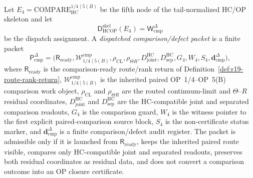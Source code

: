 \begin{definition}
\label{def:dispatched-comparison-defect-packet}
Let \(E_4=\mathrm{COMPARE}_{\mathrm{HC}}^{1/4\mid 5(B)}\) be the fifth node of the tail-normalized HC/OP skeleton and let
\[
 \mathsf D_{\mathrm{HCOP}}^{\mathrm{skel}}(E_4)
 =
 \mathsf W_{\mathrm{cmp}}^{\Delta}
\]
be the dispatch assignment. A \emph{dispatched comparison/defect packet} is a finite packet
\[
 \mathsf P_{\mathrm{cmp}}^{\Delta}
 =
 \bigl(\mathsf R_{\mathrm{ready}},
 \mathcal W_{1/4\mid 5(B)}^{\mathrm{cmp}},
 \rho_{\mathrm{CL}},\rho_{\Theta R},
 D_{\mathrm{joint}}^{\mathrm{HC}},D_{\mathrm{sep}}^{\mathrm{HC}},
 G_4,W_4,S_4,
 \mathbf d_{\mathrm{cmp}}^{\Delta}\bigr),
\]
where \(\mathsf R_{\mathrm{ready}}\) is the comparison-ready route/rank return of Definition~\ref{def:r19-route-rank-return}, \(\mathcal W_{1/4\mid 5(B)}^{\mathrm{cmp}}\) is the inherited paired OP~1/4--OP~5(B) comparison work object, \(\rho_{\mathrm{CL}}\) and \(\rho_{\Theta R}\) are the routed continuum-limit and \(\Theta\)--\(R\) residual coordinates, \(D_{\mathrm{joint}}^{\mathrm{HC}}\) and \(D_{\mathrm{sep}}^{\mathrm{HC}}\) are the HC-compatible joint and separated comparison readouts, \(G_4\) is the comparison guard, \(W_4\) is the witness pointer to the first explicit paired-comparison source block, \(S_4\) is the non-certificate status marker, and \(\mathbf d_{\mathrm{cmp}}^{\Delta}\) is a finite comparison/defect audit register. The packet is admissible only if it is launched from \(\mathsf R_{\mathrm{ready}}\), keeps the inherited paired route visible, compares only HC-compatible joint and separated readouts, preserves both residual coordinates as residual data, and does not convert a comparison outcome into an OP closure certificate.
\end{definition}

